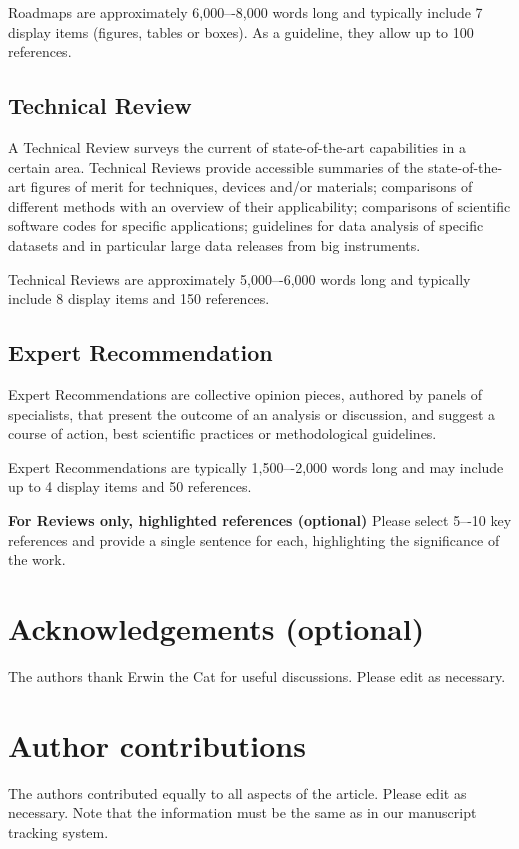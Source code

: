 \documentclass[fleqn,10pt]{wlscirep}
\begin{document}
Roadmaps are approximately 6,000–-8,000 words long and typically include 7 display items (figures, tables or boxes). As a guideline, they allow up to 100 references. 

\subsection*{Technical Review}

A Technical Review\cite{TR} surveys the current of state-of-the-art capabilities in a certain area. Technical Reviews provide accessible summaries of the state-of-the-art figures of merit for techniques, devices and/or materials; comparisons of different methods with an overview of their applicability; comparisons of scientific software codes for specific applications; guidelines for data analysis of specific datasets and in particular large data releases from big instruments.

Technical Reviews are approximately 5,000–-6,000 words long and typically include 8 display items and 150 references. 
\subsection*{Expert Recommendation}

Expert Recommendations are collective opinion pieces, authored by panels of specialists, that present the outcome of an analysis or discussion, and suggest a course of action, best scientific practices or methodological guidelines.

Expert Recommendations are typically 1,500–-2,000 words long and may include up to 4 display items and 50 references.



\noindent \textbf{For Reviews only, highlighted references (optional)} Please select 5–-10 key references and provide a single sentence for each, highlighting the significance of the work.

\section*{Acknowledgements (optional)}
The authors thank Erwin the Cat for useful discussions. Please edit as necessary.

\section*{Author contributions}
The authors contributed equally to all aspects of the article. Please edit as necessary. Note that the information must be the same as in our manuscript tracking system.
\end{document}

